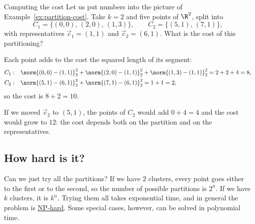 \documentclass[a4paper,12pt,oneside]{report}
\begin{document}
\begin{framedexample}{Computing the cost}\label{ex:kmeans-cost}
Let us put numbers into the picture of Example~\ref{ex:partition-cost}.
Take
$k=2$ and five points of $\R^2$, split into
\[
  C_1=\{(0,0),\,(2,0),\,(1,3)\},\qquad C_2=\{(5,1),\,(7,1)\},
\]
with representatives $\vec c_1=(1,1)$ and $\vec c_2=(6,1)$. What is the
cost of this partitioning?
\begin{center}
\end{center}
Each point adds to the cost the squared length of its segment:
\[
\begin{aligned}
  C_1:&\quad \norm{(0,0)-(1,1)}_2^2+\norm{(2,0)-(1,1)}_2^2
        +\norm{(1,3)-(1,1)}_2^2=2+2+4=8,\\
  C_2:&\quad \norm{(5,1)-(6,1)}_2^2+\norm{(7,1)-(6,1)}_2^2=1+1=2,
\end{aligned}
\]
so the cost is $8+2=10$.

If we moved $\vec c_2$ to $(5,1)$, the
points of $C_2$ would add $0+4=4$ and the cost would grow to $12$:
the cost depends both on the partition and on the representatives.
\end{framedexample}

\subsection{How hard is it?}

Can we just try all the partitions? If we have $2$ clusters, every
point goes either to the first or to the second, so the number of
possible partitions is $2^n$. If we have $k$ clusters, it is $k^n$.
Trying them all takes exponential time, and in general the problem is
\hyperref[def:np-hard]{NP-hard}. Some special cases, however,
can be solved in polynomial time.
\end{document}
